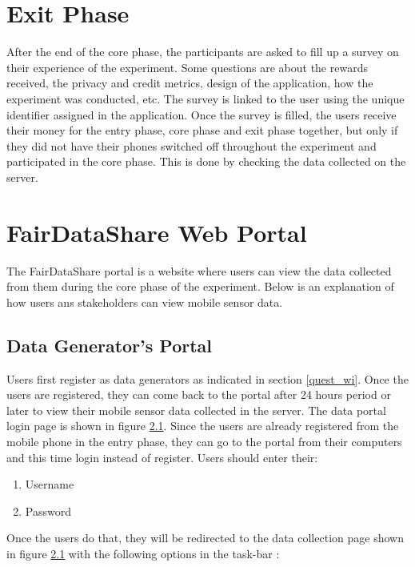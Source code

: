 \section{Exit Phase}

After the end of the core phase, the participants are asked to fill up a survey on their experience of the experiment. Some questions are
about the rewards received, the privacy and credit metrics, design of the application, how the experiment was conducted, etc. The survey is linked to the user using the unique identifier assigned in the application. Once the survey is filled, the users receive their money for the entry phase, core phase and exit phase together, but only if they did not have their phones switched off throughout the experiment and participated in the core phase. This is done by checking the data collected on the server.

\section{FairDataShare Web Portal} \label{fds}

The FairDataShare portal is a website where users can view the data collected from them during the core phase of the experiment. Below is an explanation of how users ans stakeholders can view mobile sensor data.

\subsection{Data Generator's Portal}

Users first register as data generators as indicated in section \ref{quest_wi}.
Once the users are registered, they can come back to the portal after 24 hours period or later to view their mobile sensor data collected in the server. The data portal login page is shown in figure \ref{}. Since the users are already registered from the mobile phone in the entry phase, they can go to the portal from their computers and this time login instead of register. Users should enter their: 

\begin{enumerate}
    \item Username
    \item Password
\end{enumerate}

Once the users do that, they will be redirected to the data collection page shown in figure \ref{} with the following options in the task-bar :

